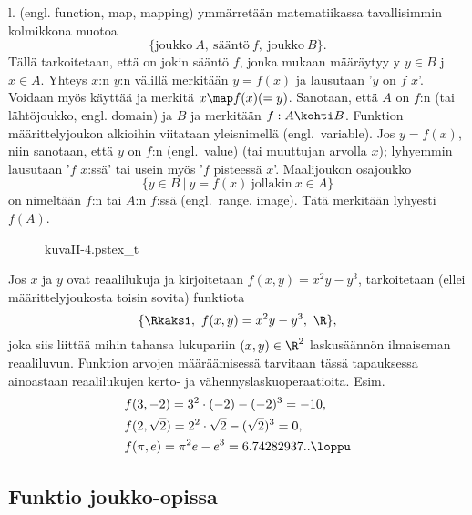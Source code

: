  l.  (engl. function, map, mapping) ymmärretään matematiikassa
tavallisimmin kolmikkona muotoa
\[
\{\text{joukko} \ A, \ \text{sääntö} \ f, \ \text{joukko} \ B\}.
\]
Tällä tarkoitetaan, että on jokin sääntö $f$, jonka mukaan määräytyy y
$y \in B$ j $x \in A$. Yhteys $x$:n $y$:n välillä merkitään $y=f(x)$ ja
lausutaan '$y$ on $f$ $x$'. Voidaan myös käyttää  ja merkitä 
$x \map f(x) (=y)$. Sanotaan, että $A$ on $f$:n
 (tai lähtöjoukko,
engl. domain) ja $B$  ja merkitään $f:A \kohti B$. Funktion määrittelyjoukon
alkioihin viitataan yleisnimellä  (engl.\ variable). Jos $y=f(x)$, niin sanotaan,
että $y$ on $f$:n  (engl.\ value)  (tai muuttujan arvolla $x$);
lyhyemmin lausutaan '$f$ $x$:ssä' tai usein myös '$f$ pisteessä $x$'. Maalijoukon osajoukko
\[
\{y \in B \ | \ y=f(x) \ \text{jollakin} \ x \in A\}
\]
on nimeltään $f$:n  tai $A$:n  $f$:ssä (engl.\ range, image). Tätä 
merkitään lyhyesti $f(A)$. 
\begin{figure}[H]
\begin{center}
{kuvaII-4.pstex_t}
\end{center}
\end{figure}
\begin{Exa}
Jos $x$ ja $y$ ovat reaalilukuja ja kirjoitetaan $f(x,y)=x^2y-y^3$, tarkoitetaan (ellei 
määrittelyjoukosta toisin sovita) funktiota
\[
\{ \Rkaksi, \ f(x,y)=x^2y-y^3, \ \R \},
\]
joka siis liittää mihin tahansa lukupariin $(x,y)\in\R^2$ laskusäännön ilmaiseman reaaliluvun.
Funktion arvojen määräämisessä tarvitaan tässä tapauksessa ainoastaan reaalilukujen 
kerto- ja vähennyslaskuoperaatioita. Esim.
\begin{align*}
&f(3,-2)=3^2 \cdot (-2) - (-2)^3 = -10, \\
&f(2,\sqrt{2})=2^2\cdot\sqrt{2}-(\sqrt{2})^3=0, \\
&f(\pi,e)=\pi^2 e - e^3=6.74282937.. \loppu
\end{align*}
\end{Exa}

\subsection*{Funktio joukko-opissa}

